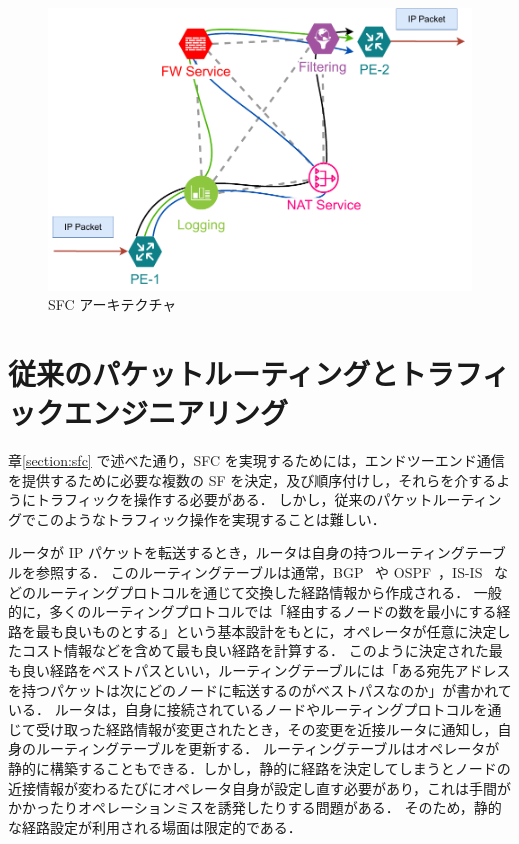 \begin{figure}[t]
    \centering
    \includegraphics[width=0.95\linewidth]{img/SFC.pdf}
    \caption{SFC アーキテクチャ}
    \label{fig:sfc-arc}
\end{figure}

\section{従来のパケットルーティングとトラフィックエンジニアリング}
\label{section:src-rtng}

章\ref*{section:sfc} で述べた通り，SFC を実現するためには，エンドツーエンド通信を提供するために必要な複数の SF を決定，及び順序付けし，それらを介するようにトラフィックを操作する必要がある．
しかし，従来のパケットルーティングでこのようなトラフィック操作を実現することは難しい．

ルータが IP パケットを転送するとき，ルータは自身の持つルーティングテーブルを参照する．
このルーティングテーブルは通常，BGP~\cite{rfc4271} や OSPF~\cite{rfc2328}，IS-IS~\cite{rfc1142} などのルーティングプロトコルを通じて交換した経路情報から作成される．
一般的に，多くのルーティングプロトコルでは「経由するノードの数を最小にする経路を最も良いものとする」という基本設計をもとに，オペレータが任意に決定したコスト情報などを含めて最も良い経路を計算する．
このように決定された最も良い経路をベストパスといい，ルーティングテーブルには「ある宛先アドレスを持つパケットは次にどのノードに転送するのがベストパスなのか」が書かれている．
ルータは，自身に接続されているノードやルーティングプロトコルを通じて受け取った経路情報が変更されたとき，その変更を近接ルータに通知し，自身のルーティングテーブルを更新する．
ルーティングテーブルはオペレータが静的に構築することもできる．しかし，静的に経路を決定してしまうとノードの近接情報が変わるたびにオペレータ自身が設定し直す必要があり，これは手間がかかったりオペレーションミスを誘発したりする問題がある．
そのため，静的な経路設定が利用される場面は限定的である．

